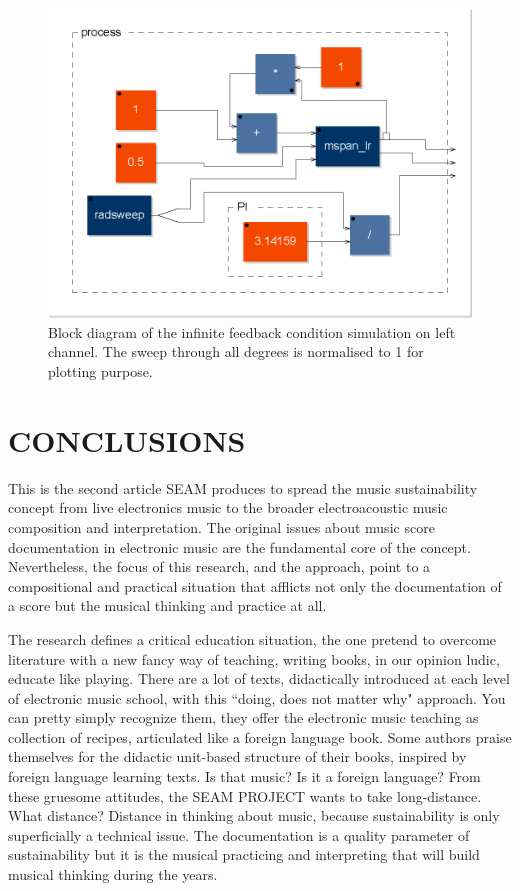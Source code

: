 \documentclass{article}
\begin{document}
\begin{figure}[h]
\centering
\includegraphics[width=1\columnwidth]{mspanlrfb_diagram}
\caption{Block diagram of the infinite feedback condition simulation on left channel. The sweep through all degrees is normalised to 1 for plotting purpose.}
\label{fig:mspan}
\end{figure}


%

\section{CONCLUSIONS}
\label{sec:conc}

This is the second article SEAM produces to spread the music sustainability concept \cite{bevi05} from live electronics music to the broader electroacoustic music composition and interpretation. The original issues about music score documentation in electronic music are the fundamental core of the concept. Nevertheless, the focus of this research, and the approach, point to a compositional and practical situation that afflicts not only the documentation of a score but the musical thinking and practice at all. 

The research defines a critical education situation, the one pretend to overcome literature with a new fancy way of teaching, writing books, in our opinion ludic, educate like playing. There are a lot of texts, didactically introduced at each level of electronic music school, with this “doing, does not matter why" approach. You can pretty simply recognize them, they offer the electronic music teaching as collection of recipes, articulated like a foreign language book. Some authors praise themselves for the didactic unit-based structure of their books, inspired by foreign language learning texts. Is that music? Is it a foreign language? From these gruesome attitudes, the SEAM PROJECT wants to take long-distance. What distance? Distance in thinking about music, because sustainability is only superficially a technical issue. The documentation is a quality parameter of sustainability but it is the musical practicing and interpreting that will build musical thinking during the years.
\end{document}
